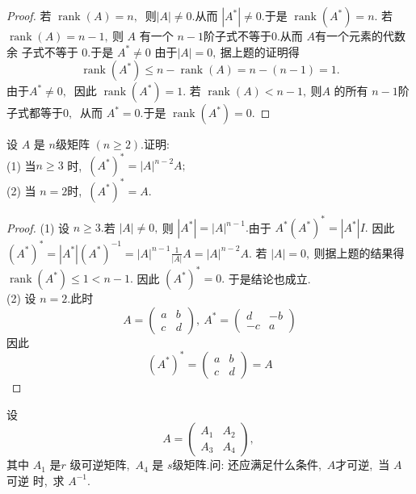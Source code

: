 \begin{proof}
	若 $ \operatorname{rank}(A)=n ,\ $ 则$  |A| \neq 0 .$从而  $\left|A^{*}\right| \neq 0 .$于是 $ \operatorname{rank}\left(A^{*}\right)=n .$
	若 $ \operatorname{rank}(A)=n-1 ,\  $则  $A $ 有一个 $ n-1  $阶子式不等于$ 0 .$从而 $ A  $有一个元素的代数余 子式不等于 $0 .$于是 $ A^{*} \neq 0$  由于$  |A|=0 ,\  $据上题的证明得
	$$\operatorname{rank}\left(A^{*}\right) \leqslant n-\operatorname{rank}(A)=n-(n-1)=1 .$$
	由于$  A^{*} \neq 0 ,\ $ 因此  $\operatorname{rank}\left(A^{*}\right)=1 .$
	若 $ \operatorname{rank}(A)<n-1 ,\  $则$  A $ 的所有 $ n-1  $阶子式都等于$ 0 ,\ $ 从而  $A^{*}=0 .$于是 $ \operatorname{rank}\left(A^{*}\right)=0 .$
\end{proof}
\newpage
\begin{problem}
	设  $A $ 是 $ n  $级矩阵  $(n \geqslant 2).$证明:\\
	(1) 当$ n \geqslant 3$ 时,\   $\left(A^{*}\right)^{*}=|A|^{n-2} A ;$\\
	(2) 当  $n=2  $时,\ $  \left(A^{*}\right)^{*}=A .$
\end{problem}
\begin{proof}
	(1) 设  $n \geqslant 3 .$若 $ |A| \neq 0 ,\  $则  $\left|A^{*}\right|=|A|^{n-1} .$由于  $A^{*}\left(A^{*}\right)^{*}=\left|A^{*}\right| I .$
	因此  $\left(A^{*}\right)^{*}=\left|A^{*}\right|\left(A^{*}\right)^{-1}=|A|^{n-1} \frac{1}{|A|} A=|A|^{n-2} A .$
	若  $|A|=0 ,\  $则据上题的结果得 $ \operatorname{rank}\left(A^{*}\right) \leqslant 1<n-1 .$
	因此 $ \left(A^{*}\right)^{*}=0 .$ 于是结论也成立.\\
	(2) 设  $n=2 .$此时
	$$A=\left(\begin{array}{ll}
		a & b \\
		c & d
	\end{array}\right),\  A^{*}=\left(\begin{array}{rr}
		d & -b \\
		-c & a
	\end{array}\right)$$
	因此
	$$\left(A^{*}\right)^{*}=\left(\begin{array}{ll}
		a & b \\
		c & d
	\end{array}\right)=A$$
\end{proof}
\newpage
\begin{problem}
	设
	$$A=\left(\begin{array}{ll}
		A_{1} & A_{2} \\
		A_{3} & A_{4}
	\end{array}\right),\ $$
	其中 $ A_{1}$  是$  r$  级可逆矩阵,\   $A_{4} $ 是  $s  $级矩阵.问: 还应满足什么条件,\  $ A  $才可逆,\  当  $A$ 可逆 时,\  求 $ A^{-1}  .$
\end{problem}
